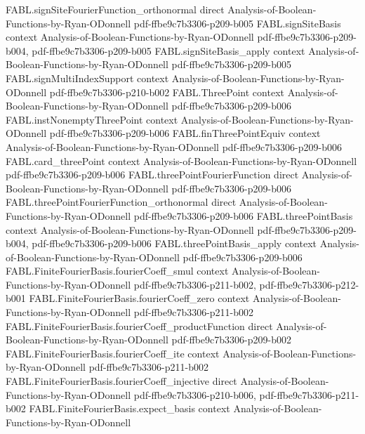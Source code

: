\begin{theorem}
  {FABL.signSiteFourierFunction_orthonormal}
  {direct}
  {Analysis-of-Boolean-Functions-by-Ryan-ODonnell}
  {pdf-ffbe9c7b3306-p209-b005}
\proofstep
  {FABL.signSiteBasis}
  {context}
  {Analysis-of-Boolean-Functions-by-Ryan-ODonnell}
  {pdf-ffbe9c7b3306-p209-b004,
    pdf-ffbe9c7b3306-p209-b005}
\proofstep
  {FABL.signSiteBasis_apply}
  {context}
  {Analysis-of-Boolean-Functions-by-Ryan-ODonnell}
  {pdf-ffbe9c7b3306-p209-b005}
\proofstep
  {FABL.signMultiIndexSupport}
  {context}
  {Analysis-of-Boolean-Functions-by-Ryan-ODonnell}
  {pdf-ffbe9c7b3306-p210-b002}
\proofstep
  {FABL.ThreePoint}
  {context}
  {Analysis-of-Boolean-Functions-by-Ryan-ODonnell}
  {pdf-ffbe9c7b3306-p209-b006}
\proofstep
  {FABL.instNonemptyThreePoint}
  {context}
  {Analysis-of-Boolean-Functions-by-Ryan-ODonnell}
  {pdf-ffbe9c7b3306-p209-b006}
\proofstep
  {FABL.finThreePointEquiv}
  {context}
  {Analysis-of-Boolean-Functions-by-Ryan-ODonnell}
  {pdf-ffbe9c7b3306-p209-b006}
\proofstep
  {FABL.card_threePoint}
  {context}
  {Analysis-of-Boolean-Functions-by-Ryan-ODonnell}
  {pdf-ffbe9c7b3306-p209-b006}
\proofstep
  {FABL.threePointFourierFunction}
  {direct}
  {Analysis-of-Boolean-Functions-by-Ryan-ODonnell}
  {pdf-ffbe9c7b3306-p209-b006}
\proofstep
  {FABL.threePointFourierFunction_orthonormal}
  {direct}
  {Analysis-of-Boolean-Functions-by-Ryan-ODonnell}
  {pdf-ffbe9c7b3306-p209-b006}
\proofstep
  {FABL.threePointBasis}
  {context}
  {Analysis-of-Boolean-Functions-by-Ryan-ODonnell}
  {pdf-ffbe9c7b3306-p209-b004,
    pdf-ffbe9c7b3306-p209-b006}
\proofstep
  {FABL.threePointBasis_apply}
  {context}
  {Analysis-of-Boolean-Functions-by-Ryan-ODonnell}
  {pdf-ffbe9c7b3306-p209-b006}
\proofstep
  {FABL.FiniteFourierBasis.fourierCoeff_smul}
  {context}
  {Analysis-of-Boolean-Functions-by-Ryan-ODonnell}
  {pdf-ffbe9c7b3306-p211-b002,
    pdf-ffbe9c7b3306-p212-b001}
\proofstep
  {FABL.FiniteFourierBasis.fourierCoeff_zero}
  {context}
  {Analysis-of-Boolean-Functions-by-Ryan-ODonnell}
  {pdf-ffbe9c7b3306-p211-b002}
\proofstep
  {FABL.FiniteFourierBasis.fourierCoeff_productFunction}
  {direct}
  {Analysis-of-Boolean-Functions-by-Ryan-ODonnell}
  {pdf-ffbe9c7b3306-p209-b002}
\proofstep
  {FABL.FiniteFourierBasis.fourierCoeff_ite}
  {context}
  {Analysis-of-Boolean-Functions-by-Ryan-ODonnell}
  {pdf-ffbe9c7b3306-p211-b002}
\proofstep
  {FABL.FiniteFourierBasis.fourierCoeff_injective}
  {direct}
  {Analysis-of-Boolean-Functions-by-Ryan-ODonnell}
  {pdf-ffbe9c7b3306-p210-b006,
    pdf-ffbe9c7b3306-p211-b002}
\proofstep
  {FABL.FiniteFourierBasis.expect_basis}
  {context}
  {Analysis-of-Boolean-Functions-by-Ryan-ODonnell}

\end{theorem}
